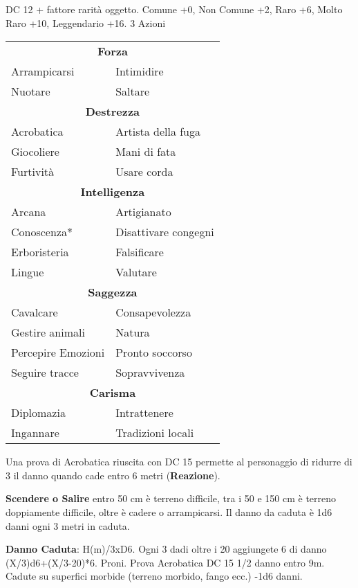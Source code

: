 \documentclass[landscape,10pt,a4paper]{article}
\begin{document}
\begin{multicols}{3}
\begin{dmbox}[title=Valutare]	
	DC 12 + fattore rarità oggetto. Comune +0, Non Comune +2, Raro +6, Molto Raro +10, Leggendario +16. 3 Azioni
\end{dmbox}	


\begin{dmbox}[title=Competenze]	
	\begin{tabularx}{0.95\linewidth}{ll}
\multicolumn{2}{c}{\textbf{Forza}}	\\
Arrampicarsi 	& Intimidire\\
Nuotare			& Saltare	\\
\multicolumn{2}{c}{\textbf{Destrezza}}	\\
Acrobatica & Artista della fuga\\
Giocoliere & Mani di fata\\
Furtività & Usare corda	\\
\multicolumn{2}{c}{\textbf{Intelligenza}}	\\
Arcana &	Artigianato\\
Conoscenza*&Disattivare congegni\\
Erboristeria&	Falsificare\\
Lingue&	Valutare\\
\multicolumn{2}{c}{\textbf{Saggezza}}	\\
Cavalcare &Consapevolezza\\
Gestire animali&Natura\\
Percepire Emozioni&Pronto soccorso\\
Seguire tracce&Sopravvivenza\\
\multicolumn{2}{c}{\textbf{Carisma}}	\\
Diplomazia &Intrattenere\\
Ingannare &Tradizioni locali
\end{tabularx}
\end{dmbox}		


\begin{dmbox}[title=Acrobatica]	
Una prova di Acrobatica riuscita con DC 15 permette al personaggio di ridurre di 3 il danno quando cade entro 6 metri (\textbf{Reazione}).

\textbf{Scendere o Salire} entro 50 cm è terreno difficile, tra i 50 e 150 cm è terreno doppiamente difficile, oltre è cadere o arrampicarsi. Il danno da caduta è 1d6 danni ogni 3 metri in caduta. 


\textbf{Danno Caduta}: H(m)/3xD6. Ogni 3 dadi oltre i 20 aggiungete 6 di danno (X/3)d6+(X/3-20)*6. Proni. Prova Acrobatica DC 15 1/2 danno entro 9m.  Cadute su superfici morbide (terreno morbido, fango ecc.) -1d6 danni.
\end{dmbox}		


\end{multicols}
\end{document}
